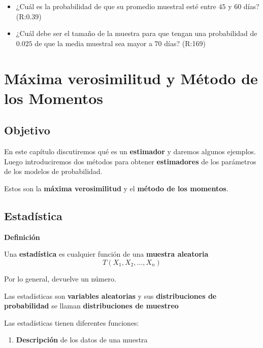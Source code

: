 \documentclass[
]{book}
\providecommand{\tightlist}{%
  \setlength{\itemsep}{0pt}\setlength{\parskip}{0pt}}
\begin{document}
\begin{itemize}
\item
  ¿Cuál es la probabilidad de que su promedio muestral esté entre \(45\) y \(60\) días? (R:0.39)
\item
  ¿Cuál debe ser el tamaño de la muestra para que tengan una probabilidad de \(0.025\) de que la media muestral sea mayor a \(70\) días? (R:169)
\end{itemize}

\hypertarget{muxe1xima-verosimilitud-y-muxe9todo-de-los-momentos}{%
\chapter{Máxima verosimilitud y Método de los Momentos}\label{muxe1xima-verosimilitud-y-muxe9todo-de-los-momentos}}

\hypertarget{objetivo-8}{%
\section{Objetivo}\label{objetivo-8}}

En este capítulo discutiremos qué es un \textbf{estimador} y daremos algunos ejemplos. Luego introduciremos dos métodos para obtener \textbf{estimadores} de los parámetros de los modelos de probabilidad.

Estos son la \textbf{máxima verosimilitud} y el \textbf{método de los momentos}.

\hypertarget{estaduxedstica-1}{%
\section{Estadística}\label{estaduxedstica-1}}

\textbf{Definición}

Una \textbf{estadística} es cualquier función de una \textbf{muestra aleatoria}
\[T(X_1,X_2, ..., X_n)\]

Por lo general, devuelve un número.

Las estadísticas son \textbf{variables aleatorias} y sus \textbf{distribuciones de probabilidad} se llaman \textbf{distribuciones de muestreo}

Las estadísticas tienen diferentes funciones:

\begin{enumerate}
\def\labelenumi{\arabic{enumi}.}
\tightlist
\item
  \textbf{Descripción} de los datos de una muestra
\end{enumerate}
\end{document}
